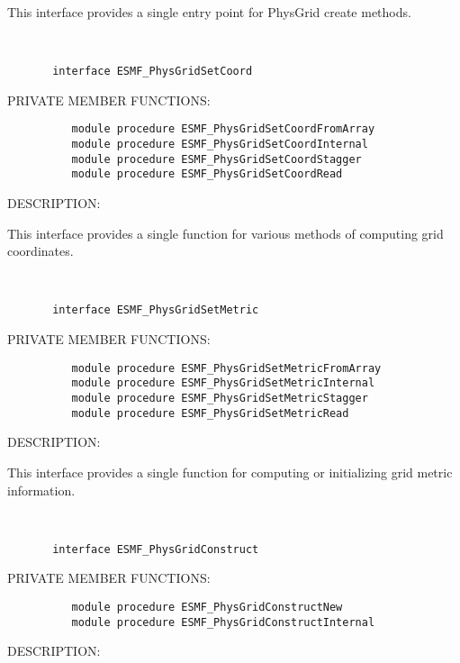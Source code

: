        This interface provides a single entry point for PhysGrid create
       methods.
   
 
\mbox{}\hrulefill\ 
 

\begin{verbatim}       interface ESMF_PhysGridSetCoord
 \end{verbatim}{\sf PRIVATE MEMBER FUNCTIONS:}
\begin{verbatim}          module procedure ESMF_PhysGridSetCoordFromArray
          module procedure ESMF_PhysGridSetCoordInternal
          module procedure ESMF_PhysGridSetCoordStagger
          module procedure ESMF_PhysGridSetCoordRead
 \end{verbatim}
{\sf DESCRIPTION:\\ }


       This interface provides a single function for various methods of
       computing grid coordinates.
   
 
\mbox{}\hrulefill\ 
 

\begin{verbatim}       interface ESMF_PhysGridSetMetric
 \end{verbatim}{\sf PRIVATE MEMBER FUNCTIONS:}
\begin{verbatim}          module procedure ESMF_PhysGridSetMetricFromArray
          module procedure ESMF_PhysGridSetMetricInternal
          module procedure ESMF_PhysGridSetMetricStagger
          module procedure ESMF_PhysGridSetMetricRead
 \end{verbatim}
{\sf DESCRIPTION:\\ }


       This interface provides a single function for computing or initializing
       grid metric information.
   
 
\mbox{}\hrulefill\ 
 

\begin{verbatim}       interface ESMF_PhysGridConstruct
 \end{verbatim}{\sf PRIVATE MEMBER FUNCTIONS:}
\begin{verbatim}          module procedure ESMF_PhysGridConstructNew
          module procedure ESMF_PhysGridConstructInternal
 \end{verbatim}
{\sf DESCRIPTION:\\ }


